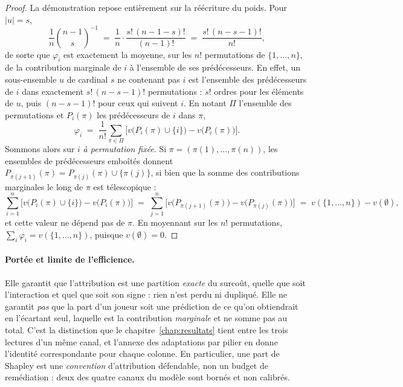 \begin{proof}
La démonstration repose entièrement sur la réécriture du poids. Pour $|u|=s$,
\begin{equation}
  \frac1n \binom{n-1}{s}^{-1} \;=\; \frac1n \cdot \frac{s!\,(n-1-s)!}{(n-1)!}
  \;=\; \frac{s!\,(n-s-1)!}{n!},
  \label{eq:poids-shapley}
\end{equation}
de sorte que $\varphi_i$ est exactement la moyenne, sur les $n!$ permutations de
$\{1,\dots,n\}$, de la contribution marginale de $i$ à l'ensemble de ses prédécesseurs. En effet,
un sous-ensemble $u$ de cardinal $s$ ne contenant pas $i$ est l'ensemble des prédécesseurs de $i$
dans exactement $s!\,(n-s-1)!$ permutations : $s!$ ordres pour les éléments de $u$, puis
$(n-s-1)!$ pour ceux qui suivent $i$. En notant $\Pi$ l'ensemble des permutations et $P_i(\pi)$
les prédécesseurs de $i$ dans $\pi$,
\[
  \varphi_i \;=\; \frac{1}{n!} \sum_{\pi \in \Pi}
              \bigl[v\bigl(P_i(\pi) \cup \{i\}\bigr) - v\bigl(P_i(\pi)\bigr)\bigr].
\]
Sommons alors sur $i$ \emph{à permutation fixée}. Si $\pi = (\pi(1),\dots,\pi(n))$, les
ensembles de prédécesseurs emboîtés donnent
$P_{\pi(j+1)}(\pi) = P_{\pi(j)}(\pi) \cup \{\pi(j)\}$, si bien que la somme des contributions
marginales le long de $\pi$ est télescopique :
\[
  \sum_{i=1}^{n} \bigl[v\bigl(P_i(\pi)\cup\{i\}\bigr)-v\bigl(P_i(\pi)\bigr)\bigr]
  \;=\; \sum_{j=1}^{n} \bigl[v\bigl(P_{\pi(j+1)}(\pi)\bigr)-v\bigl(P_{\pi(j)}(\pi)\bigr)\bigr]
  \;=\; v(\{1,\dots,n\}) - v(\emptyset),
\]
et cette valeur ne dépend pas de $\pi$. En moyennant sur les $n!$ permutations,
$\sum_i \varphi_i = v(\{1,\dots,n\})$, puisque $v(\emptyset)=0$.
\end{proof}

\paragraph{Portée et limite de l'efficience.}
Elle garantit que l'attribution est une partition \emph{exacte} du surcoût, quelle que soit
l'interaction et quel que soit son signe : rien n'est perdu ni dupliqué. Elle ne garantit
\emph{pas} que la part d'un joueur soit une prédiction de ce qu'on obtiendrait en l'écartant
seul, laquelle est la contribution \emph{marginale} et ne somme pas au total. C'est la distinction
que le chapitre~\ref{chap:resultats} tient entre les trois lectures d'un même canal, et l'annexe
des adaptations par pilier en donne l'identité correspondante pour chaque colonne. En particulier,
une part de Shapley est une \emph{convention} d'attribution défendable, non un budget de
remédiation : deux des quatre canaux du modèle sont bornés et non calibrés.

